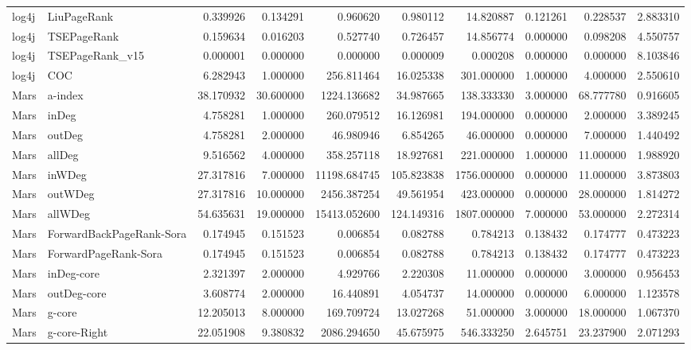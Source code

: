 \begin{tabular}{llrrrrrrrr}
log4j & LiuPageRank & 0.339926 & 0.134291 & 0.960620 & 0.980112 & 14.820887 & 0.121261 & 0.228537 & 2.883310 \\
log4j & TSEPageRank & 0.159634 & 0.016203 & 0.527740 & 0.726457 & 14.856774 & 0.000000 & 0.098208 & 4.550757 \\
log4j & TSEPageRank_v15 & 0.000001 & 0.000000 & 0.000000 & 0.000009 & 0.000208 & 0.000000 & 0.000000 & 8.103846 \\
log4j & COC & 6.282943 & 1.000000 & 256.811464 & 16.025338 & 301.000000 & 1.000000 & 4.000000 & 2.550610 \\
Mars & a-index & 38.170932 & 30.600000 & 1224.136682 & 34.987665 & 138.333330 & 3.000000 & 68.777780 & 0.916605 \\
Mars & inDeg & 4.758281 & 1.000000 & 260.079512 & 16.126981 & 194.000000 & 0.000000 & 2.000000 & 3.389245 \\
Mars & outDeg & 4.758281 & 2.000000 & 46.980946 & 6.854265 & 46.000000 & 0.000000 & 7.000000 & 1.440492 \\
Mars & allDeg & 9.516562 & 4.000000 & 358.257118 & 18.927681 & 221.000000 & 1.000000 & 11.000000 & 1.988920 \\
Mars & inWDeg & 27.317816 & 7.000000 & 11198.684745 & 105.823838 & 1756.000000 & 0.000000 & 11.000000 & 3.873803 \\
Mars & outWDeg & 27.317816 & 10.000000 & 2456.387254 & 49.561954 & 423.000000 & 0.000000 & 28.000000 & 1.814272 \\
Mars & allWDeg & 54.635631 & 19.000000 & 15413.052600 & 124.149316 & 1807.000000 & 7.000000 & 53.000000 & 2.272314 \\
Mars & ForwardBackPageRank-Sora & 0.174945 & 0.151523 & 0.006854 & 0.082788 & 0.784213 & 0.138432 & 0.174777 & 0.473223 \\
Mars & ForwardPageRank-Sora & 0.174945 & 0.151523 & 0.006854 & 0.082788 & 0.784213 & 0.138432 & 0.174777 & 0.473223 \\
Mars & inDeg-core & 2.321397 & 2.000000 & 4.929766 & 2.220308 & 11.000000 & 0.000000 & 3.000000 & 0.956453 \\
Mars & outDeg-core & 3.608774 & 2.000000 & 16.440891 & 4.054737 & 14.000000 & 0.000000 & 6.000000 & 1.123578 \\
Mars & g-core & 12.205013 & 8.000000 & 169.709724 & 13.027268 & 51.000000 & 3.000000 & 18.000000 & 1.067370 \\
Mars & g-core-Right & 22.051908 & 9.380832 & 2086.294650 & 45.675975 & 546.333250 & 2.645751 & 23.237900 & 2.071293 \\

\end{tabular}

